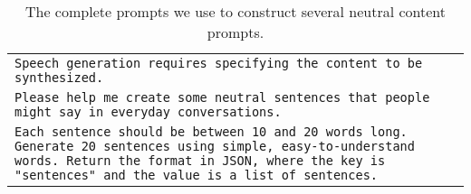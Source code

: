 \begin{table}[h]
    \footnotesize
    \centering
    \caption{The complete prompts we use to construct several neutral content prompts.}
    \begin{tabular}{p{23em}}
    \hline
    \texttt{Speech generation requires specifying the content to be synthesized.} \\
    \texttt{Please help me create some neutral sentences that people might say in everyday conversations.}\\
    \texttt{Each sentence should be between 10 and 20 words long. Generate 20 sentences using simple, easy-to-understand words. Return the format in JSON, where the key is "sentences" and the value is a list of sentences.} \\
    \hline 
\end{tabular}
    \label{appendix:construct_content_prompt}
\end{table}